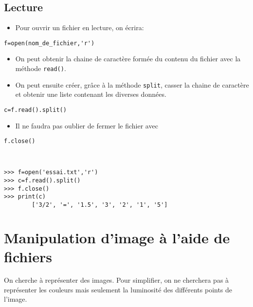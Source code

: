 \subsection*{Lecture}

\begin{itemize}
\item Pour ouvrir un fichier en lecture, on écrira:
\end{itemize}

\begin{lstlisting}
f=open(nom_de_fichier,'r')
\end{lstlisting}

\begin{itemize}
\item On peut obtenir la chaine de caractère formée du contenu du fichier avec la méthode \texttt{read()}.
\item On peut ensuite créer, grâce à la méthode \texttt{split}, casser la chaine de caractère et obtenir une liste contenant les diverses données.
\end{itemize}

\begin{lstlisting}
c=f.read().split()
\end{lstlisting}

\begin{itemize}
\item Il ne faudra pas oublier de fermer le fichier avec 
\end{itemize}
\begin{lstlisting}
f.close()
\end{lstlisting}

\begin{exemple}~\\
\begin{lstlisting}
>>> f=open('essai.txt','r')
>>> c=f.read().split()
>>> f.close()
>>> print(c)
        ['3/2', '=', '1.5', '3', '2', '1', '5']
\end{lstlisting}
\end{exemple}





\section*{Manipulation d'image à l'aide de fichiers}
	
	On cherche à représenter des  images. Pour simplifier, on ne cherchera
pas  à  représenter les  couleurs  mais  seulement  la luminosité  des
différents points de l'image.  

